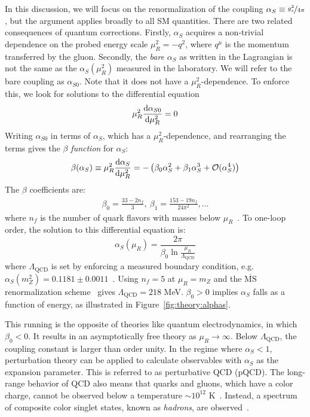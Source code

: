 In this discussion, we will focus on the renormalization of the coupling $\alpha_S \equiv \nicefrac{g_s^2}{4\pi}$, but the argument applies broadly to all SM quantities.
There are two related consequences of quantum corrections.
Firstly, $\alpha_S$ acquires a non-trivial dependence on the probed energy scale $\mu_R^2 = -q^2$, where $q^\mu$ is the momentum transferred by the gluon.
Secondly, the \emph{bare} $\alpha_S$ as written in the Lagrangian is not the same as the $\alpha_S(\mu_R^2)$ measured in the laboratory.
We will refer to the bare coupling as $\alpha_{S0}$. 
Note that it does not have a $\mu_R^2$-dependence.
To enforce this, we look for solutions to the differential equation
\begin{equation}
    \mu_R^2 \frac{\mathrm{d} \alpha_{S0}}{\mathrm{d}\mu_R^2} = 0
\end{equation}
Writing $\alpha_{S0}$ in terms of $\alpha_S$, which has a $\mu_R^2$-dependence, and rearranging the terms gives the \emph{$\beta$ function} for $\alpha_S$:
\begin{equation}
    \beta(\alpha_S) \equiv \mu_R^2 \frac{\mathrm{d} \alpha_S}{\mathrm{d}\mu_R^2} = -\left(\beta_0 \alpha_S^2 + \beta_1 \alpha_S^3 + \mathcal{O}(\alpha_S^4)\right)
\end{equation}
The $\beta$ coefficients are:
\begin{align}
    \beta_0 = \frac{33 - 2n_{f}}{3},~ 
    \beta_1 = \frac{153-19n_f}{24\pi^2} ,\dots
\end{align}
where $n_f$ is the number of quark flavors with masses below $\mu_R$~\cite{pdg,qcd1,qcd2,qcd3}.
To one-loop order, the solution to this differential equation is:
\begin{equation}
    \alpha_S(\mu_R) = \frac{2\pi}{\beta_0 \ln \frac{\mu_R}{\Lambda_\mathrm{QCD}}}
\end{equation}
where $\Lambda_\mathrm{QCD}$ is set by enforcing a measured boundary condition, e.g. $\alpha_S(m_Z^2) = 0.1181 \pm 0.0011$~\cite{pdg}.
Using $n_f=5$ at $\mu_R = m_Z$ and the $\overline{\text{MS}}$ renormalization scheme~\cite{msbar} gives $\Lambda_\mathrm{QCD} = 218$ MeV.
$\beta_0>0$ implies $\alpha_S$ falls as a function of energy, as illustrated in Figure~\ref{fig:theory:alphas}.

This running is the opposite of theories like quantum electrodynamics, in which $\beta_0<0$.
It results in an asymptotically free theory as $\mu_R\rightarrow \infty$.
Below $\Lambda_\mathrm{QCD}$, the coupling constant is larger than order unity.
In the regime where $\alpha_S < 1$, perturbation theory can be applied to calculate observables with $\alpha_S$ as the expansion parameter.
This is referred to as perturbative QCD (pQCD).
The long-range behavior of QCD also means that quarks and gluons, which have a color charge, cannot be observed below a temperature $\sim 10^{12}$ K~\cite{hagedorn}.
Instead, a spectrum of composite color singlet states, known as \emph{hadrons}, are observed~\cite{quarkmodel}.

